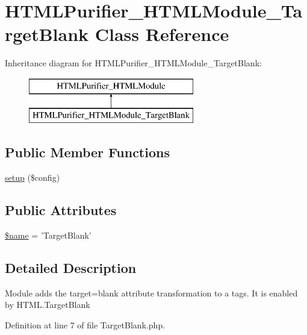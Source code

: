 \hypertarget{classHTMLPurifier__HTMLModule__TargetBlank}{\section{H\+T\+M\+L\+Purifier\+\_\+\+H\+T\+M\+L\+Module\+\_\+\+Target\+Blank Class Reference}
\label{classHTMLPurifier__HTMLModule__TargetBlank}
}
Inheritance diagram for H\+T\+M\+L\+Purifier\+\_\+\+H\+T\+M\+L\+Module\+\_\+\+Target\+Blank\+:\begin{figure}[H]
\begin{center}
\leavevmode
\includegraphics[height=2.000000cm]{classHTMLPurifier__HTMLModule__TargetBlank}
\end{center}
\end{figure}
\subsection*{Public Member Functions}
\begin{DoxyCompactItemize}
\item 
\hyperlink{classHTMLPurifier__HTMLModule__TargetBlank_a3b40f9f7c724974956236283ddd58e21}{setup} (\$config)
\end{DoxyCompactItemize}
\subsection*{Public Attributes}
\begin{DoxyCompactItemize}
\item 
\hyperlink{classHTMLPurifier__HTMLModule__TargetBlank_a128927858c5e8e63be5560f051e2abd3}{\$name} = 'Target\+Blank'
\end{DoxyCompactItemize}


\subsection{Detailed Description}
Module adds the target=blank attribute transformation to a tags. It is enabled by H\+T\+M\+L.\+Target\+Blank 

Definition at line 7 of file Target\+Blank.\+php.



